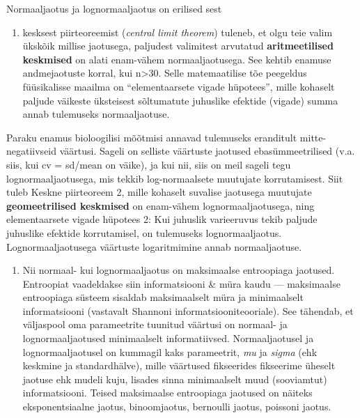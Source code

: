 \documentclass[]{book}
\providecommand{\tightlist}{%
  \setlength{\itemsep}{0pt}\setlength{\parskip}{0pt}}
\begin{document}
Normaaljaotus ja lognormaaljaotus on erilised sest

\begin{enumerate}
\def\labelenumi{(\arabic{enumi})}
\tightlist
\item
  kesksest piirteoreemist (\emph{central limit theorem}) tuleneb, et
  olgu teie valim ükskõik millise jaotusega, paljudest valimitest
  arvutatud \textbf{aritmeetilised keskmised} on alati enam-vähem
  normaaljaotusega. See kehtib enamuse andmejaotuste korral, kui
  n\textgreater{}30. Selle matemaatilise tõe peegeldus füüsikalisse
  maailma on ``elementaarsete vigade hüpotees'', mille kohaselt paljude
  väikeste üksteisest sõltumatute juhuslike efektide (vigade) summa
  annab tulemuseks normaaljaotuse.
\end{enumerate}

Paraku enamus bioloogilisi mõõtmisi annavad tulemuseks eranditult
mitte-negatiivseid väärtusi. Sageli on selliste väärtuste jaotused
ebasümmeetrilised (v.a. siis, kui cv = sd/mean on väike), ja kui nii,
siis on meil sageli tegu lognormaaljaotusega, mis tekkib log-normaalsete
muutujate korrutamisest. Siit tuleb Keskne piirteoreem 2, mille kohaselt
suvalise jaotusega muutujate \textbf{geomeetrilised keskmised} on
enam-vähem lognormaaljaotusega, ning elementaarsete vigade hüpotees 2:
Kui juhuslik varieeruvus tekib paljude juhuslike efektide korrutamisel,
on tulemuseks lognormaaljaotus. Lognormaaljaotusega väärtuste
logaritmimine annab normaaljaotuse.

\begin{enumerate}
\def\labelenumi{(\arabic{enumi})}
\setcounter{enumi}{1}
\tightlist
\item
  Nii normaal- kui lognormaaljaotus on maksimaalse entroopiaga jaotused.
  Entroopiat vaadeldakse siin informatsiooni \& müra kaudu ---
  maksimaalse entroopiaga süsteem sisaldab maksimaalselt müra ja
  minimaalselt informatsiooni (vastavalt Shannoni
  informatsiooniteooriale). See tähendab, et väljaspool oma parameetrite
  tuunitud väärtusi on normaal- ja lognormaaljaotused minimaalselt
  informatiivsed. Normaaljaotusel ja lognormaaljaotusel on kummagil kaks
  parameetrit, \emph{mu} ja \emph{sigma} (ehk keskmine ja
  standardhälve), mille väärtused fikseerides fikseerime üheselt jaotuse
  ehk mudeli kuju, lisades sinna minimaalselt muud (sooviamtut)
  informatsiooni. Teised maksimaalse entroopiaga jaotused on näiteks
  eksponentsiaalne jaotus, binoomjaotus, bernoulli jaotus, poissoni
  jaotus.
\end{enumerate}
\end{document}
